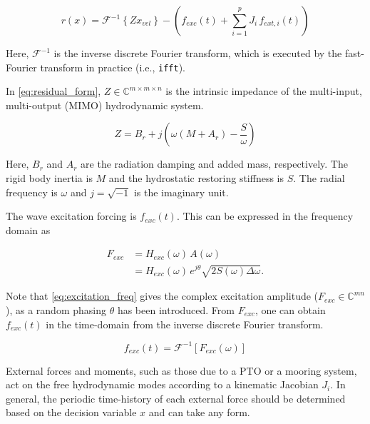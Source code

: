 \documentclass[]{article}
\begin{document}
\begin{equation}\label{eq:residual_form}
	r(x) = \mathcal{F}^{-1}\left\{ Z x_{vel} \right\} - \left( f_{exc}(t) + \sum\limits_{i=1}^p J_i \, f_{ext,i}(t) \right)
\end{equation}

\noindent{}Here, $\mathcal{F}^{-1}$ is the inverse discrete Fourier transform, which is executed by the fast-Fourier transform in practice (i.e., \texttt{ifft}).

In \eqref{eq:residual_form}, $Z\in \mathbb{C}^{m\times{}m\times{}n}$ is the intrinsic impedance of the multi-input, multi-output (MIMO) hydrodynamic system.

\begin{equation}
	Z = B_r + j\left( \omega\left(  M + A_r \right) -\frac{S}{\omega} \right)
\end{equation}

\noindent{}Here, $B_r$ and $A_r$ are the radiation damping and added mass, respectively.
The rigid body inertia is $M$ and the hydrostatic restoring stiffness is $S$.
The radial frequency is $\omega$ and $j=\sqrt{-1}$ is the imaginary unit.

The wave excitation forcing is $f_{exc}(t)$.
This can be expressed in the frequency domain as

\begin{equation}\label{eq:excitation_freq}
	\begin{aligned}
		F_{exc} &= H_{exc}(\omega) \, A(\omega) \\
		&= H_{exc} (\omega) \, e^{j \theta} \sqrt{2 S(\omega) \Delta \omega}.
	\end{aligned}
\end{equation}

\noindent{}Note that \eqref{eq:excitation_freq} gives the complex excitation amplitude ($F_{exc} \in \mathbb{C}^{mn}$), as a random phasing $\theta$ has been introduced.
From $F_{exc}$, one can obtain $f_{exc}(t)$ in the time-domain from the inverse discrete Fourier transform.

\begin{equation}
	f_{exc}(t) = \mathcal{F}^{-1} \left[ F_{exc}(\omega) \right]
\end{equation}

External forces and moments, such as those due to a PTO or a mooring system, act on the free hydrodynamic modes according to a kinematic Jacobian $J_i$.
In general, the periodic time-history of each external force should be determined based on the decision variable $x$ and can take any form.
\end{document}
